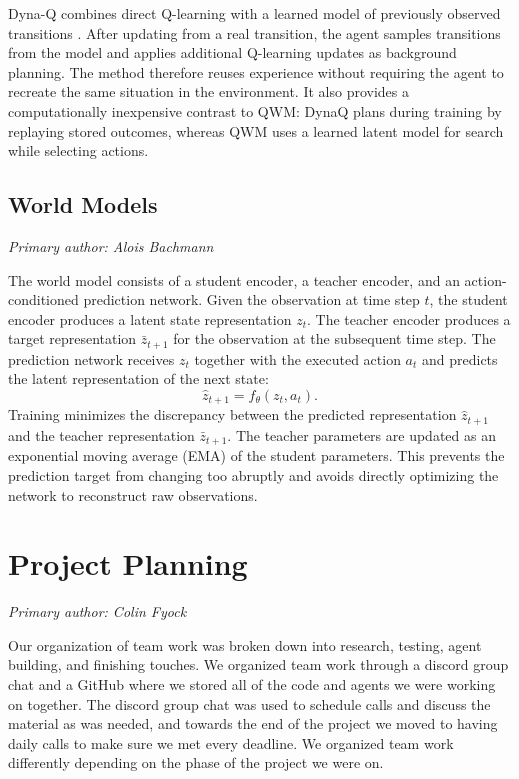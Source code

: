 \documentclass[article, 10pt]{IEEEtran}
\begin{document}
Dyna-Q combines direct Q-learning with a learned model of previously observed transitions \cite{sutton1990integrated}. After updating from a real transition, the agent samples transitions from the model and applies additional Q-learning updates as background planning. The method therefore reuses experience without requiring the agent to recreate the same situation in the environment. It also provides a computationally inexpensive contrast to QWM: DynaQ plans during training by replaying stored outcomes, whereas QWM uses a learned latent model for search while selecting actions.

\subsection{World Models}

\textit{Primary author: Alois Bachmann}

The world model consists of a student encoder, a teacher encoder, and an action-conditioned prediction network. Given the observation at time step \(t\), the student encoder produces a latent state representation \(z_t\). The teacher encoder produces a target representation \(\bar{z}_{t+1}\) for the observation at the subsequent time step. The prediction network receives \(z_t\) together with the executed action \(a_t\) and predicts the latent representation of the next state:
\[
\hat{z}_{t+1} = f_{\theta}(z_t, a_t).
\]
Training minimizes the discrepancy between the predicted representation \(\hat{z}_{t+1}\) and the teacher representation \(\bar{z}_{t+1}\). The teacher parameters are updated as an exponential moving average (EMA) of the student parameters. This prevents the prediction target from changing too abruptly and avoids directly optimizing the network to reconstruct raw observations.


\section{Project Planning}\label{sec:3_projectplanning}

\textit{Primary author: Colin Fyock}

Our organization of team work was broken down into research, testing, agent building, and finishing touches. We organized team work through a discord group chat and a GitHub where we stored all of the code and agents we were working on together. The discord group chat was used to schedule calls and discuss the material as was needed, and towards the end of the project we moved to having daily calls to make sure we met every deadline. We organized team work differently depending on the phase of the project we were on. 
\end{document}
